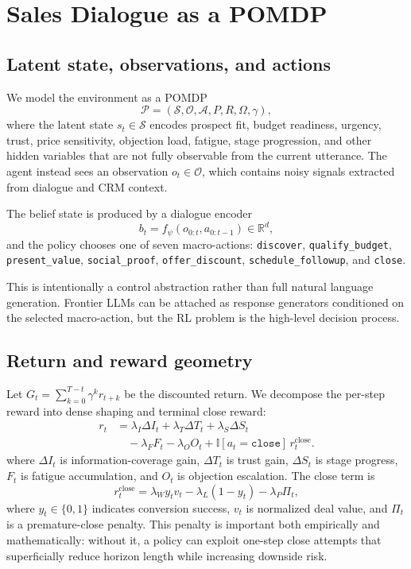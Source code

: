 \documentclass[conference]{IEEEtran}
\begin{document}
\section{Sales Dialogue as a POMDP}
\subsection{Latent state, observations, and actions}
We model the environment as a POMDP
\begin{equation}
\mathcal{P}=(\mathcal{S},\mathcal{O},\mathcal{A},P,R,\Omega,\gamma),
\end{equation}
where the latent state \(s_t\in\mathcal{S}\) encodes prospect fit, budget readiness, urgency, trust, price sensitivity, objection load, fatigue, stage progression, and other hidden variables that are not fully observable from the current utterance. The agent instead sees an observation \(o_t\in\mathcal{O}\), which contains noisy signals extracted from dialogue and CRM context.

The belief state is produced by a dialogue encoder
\begin{equation}
b_t = f_\psi(o_{0:t}, a_{0:t-1}) \in \mathbb{R}^d,
\end{equation}
and the policy chooses one of seven macro-actions:
\texttt{discover}, \texttt{qualify\_budget}, \texttt{present\_value},
\texttt{social\_proof}, \texttt{offer\_discount},
\texttt{schedule\_followup}, and \texttt{close}.

This is intentionally a control abstraction rather than full natural language generation. Frontier LLMs can be attached as response generators conditioned on the selected macro-action, but the RL problem is the high-level decision process.

\subsection{Return and reward geometry}
Let \(G_t=\sum_{k=0}^{T-t}\gamma^k r_{t+k}\) be the discounted return. We decompose the per-step reward into dense shaping and terminal close reward:
\begin{equation}
\label{eq:reward}
\begin{aligned}
r_t &=
\lambda_I \Delta I_t +
\lambda_T \Delta T_t +
\lambda_S \Delta S_t \\
&\quad
- \lambda_F F_t -
\lambda_O O_t +
\mathbb{I}[a_t=\texttt{close}]\,r_t^{\text{close}} .
\end{aligned}
\end{equation}
where \(\Delta I_t\) is information-coverage gain, \(\Delta T_t\) is trust gain, \(\Delta S_t\) is stage progress, \(F_t\) is fatigue accumulation, and \(O_t\) is objection escalation. The close term is
\begin{equation}
r_t^{\text{close}} = \lambda_W y_t v_t - \lambda_L (1-y_t) - \lambda_P \Pi_t,
\end{equation}
where \(y_t\in\{0,1\}\) indicates conversion success, \(v_t\) is normalized deal value, and \(\Pi_t\) is a premature-close penalty. This penalty is important both empirically and mathematically: without it, a policy can exploit one-step close attempts that superficially reduce horizon length while increasing downside risk.
\end{document}
